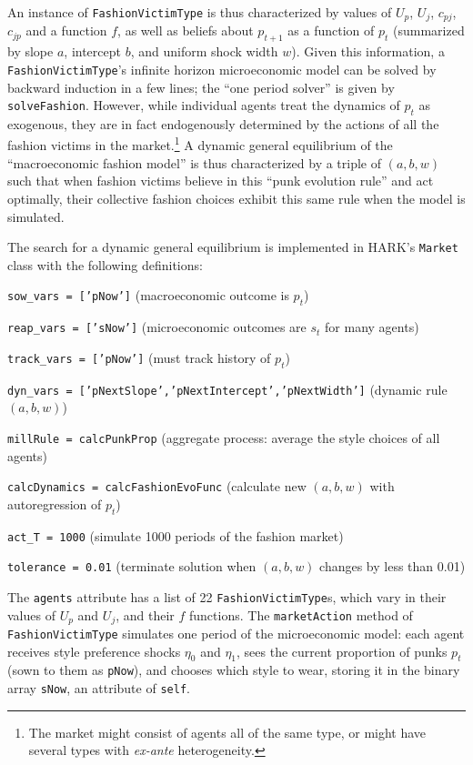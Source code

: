 \documentclass[12pt,titlepage,letterpaper]{econtex}
\begin{document}
{An instance of \texttt{FashionVictimType} is thus characterized by values of $U_p$, $U_j$, $c_{pj}$, $c_{jp}$ and a function $f$, as well as beliefs about $p_{t+1}$ as a function of $p_t$ (summarized by slope $a$, intercept $b$, and uniform shock width $w$).  Given this information, a \texttt{FashionVictimType}'s infinite horizon microeconomic model can be solved by backward induction in a few lines; the ``one period solver'' is given by \texttt{solveFashion}.  However, while individual agents treat the dynamics of $p_t$ as exogenous, they are in fact endogenously determined by the actions of all the fashion victims in the market.\footnote{The market might consist of agents all of the same type, or might have several types with \textit{ex-ante} heterogeneity.}  A dynamic general equilibrium of the ``macroeconomic fashion model'' is thus characterized by a triple of $(a,b,w)$ such that when fashion victims believe in this ``punk evolution rule'' and act optimally, their collective fashion choices exhibit this same rule when the model is simulated.

The search for a dynamic general equilibrium is implemented in HARK's \texttt{Market} class with the following definitions:

\vspace{0.25cm}

\noindent \texttt{sow\_vars      = ['pNow']} (macroeconomic outcome is $p_t$)

\noindent \texttt{reap\_vars     = ['sNow']} (microeconomic outcomes are $s_t$ for many agents)

\noindent \texttt{track\_vars    = ['pNow']} (must track history of $p_t$)

\noindent \texttt{dyn\_vars      = ['pNextSlope','pNextIntercept','pNextWidth']} (dynamic rule $(a,b,w)$)

\noindent \texttt{millRule      = calcPunkProp} (aggregate process: average the style choices of all agents)

\noindent \texttt{calcDynamics  = calcFashionEvoFunc} (calculate new $(a,b,w)$ with autoregression of $p_t$)

\noindent \texttt{act\_T         = 1000} (simulate 1000 periods of the fashion market)

\noindent \texttt{tolerance     = 0.01} (terminate solution when $(a,b,w)$ changes by less than 0.01)

\vspace{0.25cm}

The \texttt{agents} attribute has a list of 22 \texttt{FashionVictimType}s, which vary in their values of $U_p$ and $U_j$, and their $f$ functions.  The \texttt{marketAction} method of \texttt{FashionVictimType} simulates one period of the microeconomic model: each agent receives style preference shocks $\eta_0$ and $\eta_1$, sees the current proportion of punks $p_t$ (sown to them as \texttt{pNow}), and chooses which style to wear, storing it in the binary array \texttt{sNow}, an attribute of \texttt{self}.

}
\end{document}
